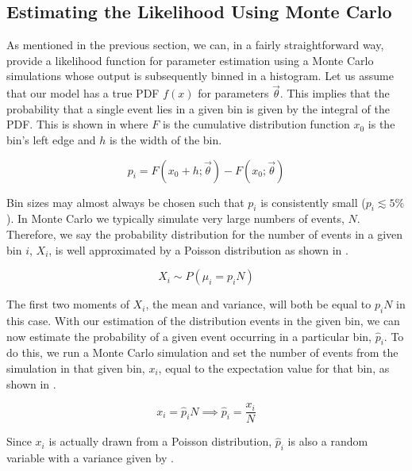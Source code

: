 \subsection{Estimating the Likelihood Using Monte Carlo}


As mentioned in the previous section, we can, in a fairly straightforward way, provide a likelihood function for parameter estimation using a Monte Carlo simulations whose output is subsequently binned in a histogram.  Let us assume that our model has a true PDF $f(x)$ for parameters $\vec{\theta}$.  This implies that the probability that a single event lies in a given bin is given by the integral of the PDF.  This is shown in  where $F$ is the cumulative distribution function $x_0$ is the bin's left edge and $h$ is the width of the bin.  

\begin{equation}
        \label{eqn:gpu_integral_pdf}
        p_i = F(x_0+h; \vec{\theta}) - F(x_0; \vec{\theta})
\end{equation}

Bin sizes may almost always be chosen such that $p_i$ is consistently small ($p_i \lesssim 5\%$).  In Monte Carlo we typically simulate very large numbers of events, $N$.  Therefore, we say the probability distribution for the number of events in a given bin $i$, $X_i$, is well approximated by a Poisson distribution as shown in .

\begin{equation}
        \label{eqn:gpu_poisson_bin}
        X_i \sim P(\mu_i = p_iN)
\end{equation}

The first two moments of $X_i$, the mean and variance, will both be equal to $p_i N$ in this case.  With our estimation of the distribution events in the given bin, we can now estimate the probability of a given event occurring in a particular bin, $\hat{p}_i$.  To do this, we run a Monte Carlo simulation and set the number of events from the simulation in that given bin, $x_i$, equal to the expectation value for that bin, as shown in .


\begin{equation}
        \label{eqn:gpu_expectation_val}
        x_i = \hat{p}_i N \implies \hat{p}_i = \frac{x_i}{N}
\end{equation}


Since $x_i$ is actually drawn from a Poisson distribution, $\hat{p}_i$ is also a random variable with a variance given by .


